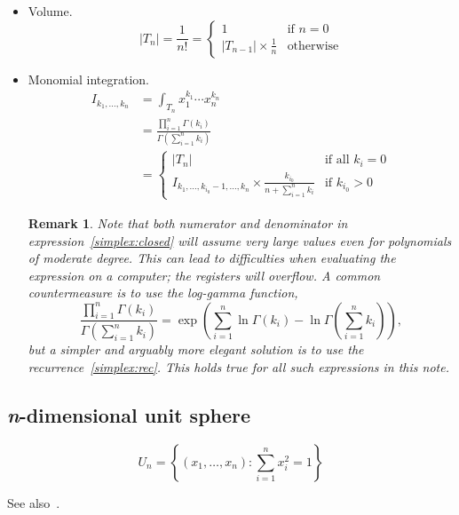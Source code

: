 \documentclass[draft]{scrartcl}
\newtheorem*{remark}{Remark}
\begin{document}
\begin{itemize}
  \item Volume.
    \begin{equation}
      |T_n| = \frac{1}{n!} = \begin{cases}
        1&\text{if $n=0$}\\
        |T_{n-1}| \times \frac{1}{n}&\text{otherwise}
      \end{cases}
    \end{equation}
  \item Monomial integration.
  \begin{align}\nonumber
    I_{k_1,\dots,k_n}
    &= \int_{T_n} x_1^{k_1}\cdots x_n^{k_n}\\
    &= \frac{\prod_{i=1}^n\Gamma(k_i)}{\Gamma\left(\sum_{i=1}^n
    k_i\right)}\label{simplex:closed}\\
    &=\begin{cases}
      |T_n|&\text{if all $k_i=0$}\\
      I_{k_1,\dots,k_{i_0}-1,\dots,k_n} \times \frac{k_{i_0}}{n + \sum_{i=1}^n k_i}&\text{if $k_{i_0} > 0$}
    \end{cases}\label{simplex:rec}
  \end{align}
  \begin{remark}
  Note that both numerator and denominator in expression~\eqref{simplex:closed} will
    assume very large values even for polynomials of moderate degree. This can lead to
    difficulties when evaluating the expression on a computer; the registers will
    overflow. A common countermeasure is to use the log-gamma function,
    \[
    \frac{\prod_{i=1}^n\Gamma(k_i)}{\Gamma\left(\sum_{i=1}^n k_i\right)}
    = \exp\left(\sum_{i=1}^n\ln\Gamma(k_i) - \ln\Gamma\left(\sum_{i=1}^n
    k_i\right)\right),
    \]
    but a simpler and arguably more elegant solution is to use the
    recurrence~\eqref{simplex:rec}. This holds true for all such expressions in this
    note.
  \end{remark}

\end{itemize}

\subsection*{\textit{n}-dimensional unit sphere}
\[
  U_n = \left\{(x_1,\dots,x_n): \sum_{i=1}^n x_i^2 = 1\right\}
\]

See also~\cite{tau}.
\end{document}
